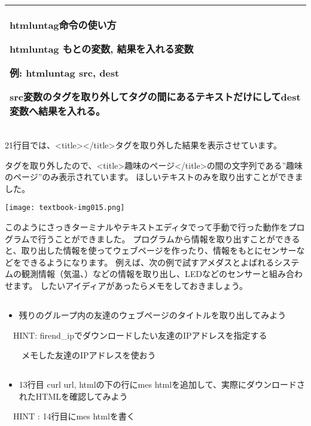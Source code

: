 \begin{center}
\tablefirsthead{}
\tablehead{}
\tabletail{}
\tablelasttail{}
\begin{supertabular}{|m{16.806cm}|}
\hline
htmluntag命令の使い方

{\bfseries htmluntag もとの変数, 結果を入れる変数}

例: htmluntag src, dest

src変数のタグを取り外してタグの間にあるテキストだけにしてdest変数へ結果を入れる。\\\hline
\end{supertabular}
\end{center}

21行目では、{\textless}title{\textgreater}{\textless}/title{\textgreater}タグを取り外した結果を表示させています。

タグを取り外したので、{\textless}title{\textgreater}趣味のページ{\textless}/title{\textgreater}の間の文字列である”趣味のページ”のみ表示されています。
ほしいテキストのみを取り出すことができました。

\begin{center}
  \texttt{[image: textbook-img015.png]}
\end{center}

このようにさっきターミナルやテキストエディタでって手動で行った動作をプログラムで行うことができました。
プログラムから情報を取り出すことができると、取り出した情報を使ってウェブページを作ったり、情報をもとにセンサーなどをできるようになります。
例えば、次の例で試すアメダスとよばれるシステムの観測情報（気温、）などの情報を取り出し、LEDなどのセンサーと組み合わせます。
したいアイディアがあったらメモをしておきましょう。

\clearpage
\subsection*{\theQuestion\label{Q:title}}
\begin{itemize}
  \item 残りのグループ内の友達のウェブページのタイトルを取り出してみよう
\end{itemize}
\ \ HINT:
firend\_ipでダウンロードしたい友達のIPアドレスを指定する

\ \ \ \ メモした友達のIPアドレスを使おう

\subsection*{\theQuestion\label{Q:mes}}
\begin{itemize}
\item 13行目 curl url, htmlの下の行にmes htmlを追加して、実際にダウンロードされたHTMLを確認してみよう
\end{itemize}
\ \ HINT : 14行目にmes htmlを書く

